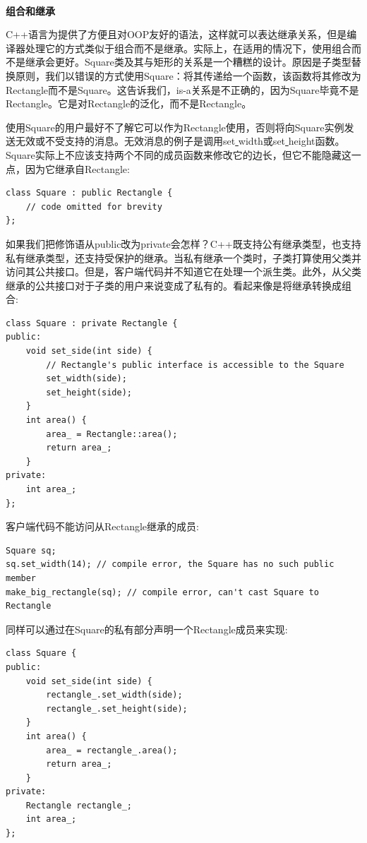 \noindent\textbf{}\ \par
\textbf{组合和继承} \ \par
C++语言为提供了方便且对OOP友好的语法，这样就可以表达继承关系，但是编译器处理它的方式类似于组合而不是继承。实际上，在适用的情况下，使用组合而不是继承会更好。Square类及其与矩形的关系是一个糟糕的设计。原因是子类型替换原则，我们以错误的方式使用Square：将其传递给一个函数，该函数将其修改为Rectangle而不是Square。这告诉我们，is-a关系是不正确的，因为Square毕竟不是Rectangle。它是对Rectangle的泛化，而不是Rectangle。\par
使用Square的用户最好不了解它可以作为Rectangle使用，否则将向Square实例发送无效或不受支持的消息。无效消息的例子是调用set\underline{ }width或set\underline{ }height函数。Square实际上不应该支持两个不同的成员函数来修改它的边长，但它不能隐藏这一点，因为它继承自Rectangle: \par

\begin{lstlisting}[caption={}]
class Square : public Rectangle {
	// code omitted for brevity
};
\end{lstlisting}

如果我们把修饰语从public改为private会怎样？C++既支持公有继承类型，也支持私有继承类型，还支持受保护的继承。当私有继承一个类时，子类打算使用父类并访问其公共接口。但是，客户端代码并不知道它在处理一个派生类。此外，从父类继承的公共接口对于子类的用户来说变成了私有的。看起来像是将继承转换成组合:\par

\begin{lstlisting}[caption={}]
class Square : private Rectangle {
public:
	void set_side(int side) {
		// Rectangle's public interface is accessible to the Square
		set_width(side);
		set_height(side);
	}
	int area() {
		area_ = Rectangle::area();
		return area_;
	}
private:
	int area_;
};
\end{lstlisting}

客户端代码不能访问从Rectangle继承的成员: \par

\begin{lstlisting}[caption={}]
Square sq;
sq.set_width(14); // compile error, the Square has no such public member
make_big_rectangle(sq); // compile error, can't cast Square to Rectangle
\end{lstlisting}

同样可以通过在Square的私有部分声明一个Rectangle成员来实现: \par

\begin{lstlisting}[caption={}]
class Square {
public:
	void set_side(int side) {
		rectangle_.set_width(side);
		rectangle_.set_height(side);
	}
	int area() {
		area_ = rectangle_.area();
		return area_;
	}
private:
	Rectangle rectangle_;
	int area_;
};
\end{lstlisting}

